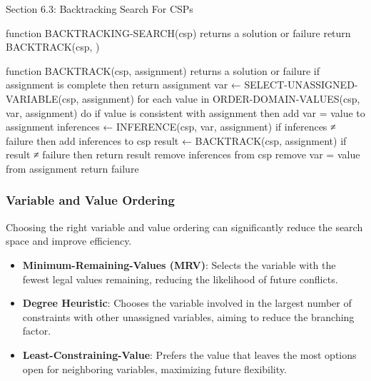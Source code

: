 \begin{notes}{Section 6.3: Backtracking Search For CSPs}
\begin{highlight}
    \begin{code}[Pseudo]
    function BACKTRACKING-SEARCH(csp) returns a solution or failure
        return BACKTRACK(csp, {})
    
    function BACKTRACK(csp, assignment) returns a solution or failure
        if assignment is complete then return assignment
        var ← SELECT-UNASSIGNED-VARIABLE(csp, assignment)
        for each value in ORDER-DOMAIN-VALUES(csp, var, assignment) do
            if value is consistent with assignment then
                add {var = value} to assignment
                inferences ← INFERENCE(csp, var, assignment)
                if inferences ≠ failure then
                    add inferences to csp
                    result ← BACKTRACK(csp, assignment)
                    if result ≠ failure then return result
                    remove inferences from csp
                remove {var = value} from assignment
        return failure
    \end{code}
    
    \end{highlight}
    
    
    \subsubsection*{Variable and Value Ordering}
    
    Choosing the right variable and value ordering can significantly reduce the search space and improve efficiency.
    
    \begin{highlight}
    
        \begin{itemize}
            \item \textbf{Minimum-Remaining-Values (MRV)}: Selects the variable with the fewest legal values remaining, reducing the likelihood of future conflicts.
            \item \textbf{Degree Heuristic}: Chooses the variable involved in the largest number of constraints with other unassigned variables, aiming to reduce the branching factor.
            \item \textbf{Least-Constraining-Value}: Prefers the value that leaves the most options open for neighboring variables, maximizing future flexibility.
        \end{itemize}
    
    \end{highlight}
    

\end{notes}
